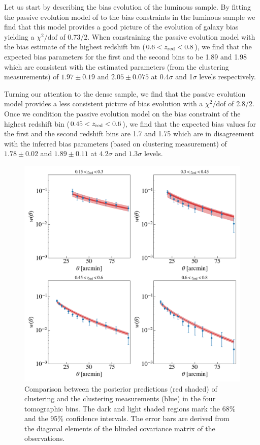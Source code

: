 \documentclass[fleqn,usenatbib,useAMS]{mnras}
\begin{document}
Let us start by describing the bias evolution of the luminous sample. By fitting the passive evolution model of \citet{Fry1996} to the bias constraints in the luminous sample we find that this model provides a good picture of the evolution of galaxy bias yielding a $\chi^2/\mathrm{dof}$ of 0.73/2. When constraining the passive evolution model with the bias estimate of the highest redshift bin ($0.6<z_{\rm red}<0.8$), we find that the expected bias parameters for the first and the second bins to be 1.89 and 1.98 which are consistent with the estimated parameters (from the clustering measurements) of $1.97\pm0.19$ and $2.05\pm 0.075$ at 0.4$\sigma$ and 1$\sigma$ levels respectively. 

Turning our attention to the dense sample, we find that the passive evolution model provides a less consistent picture of bias evolution with a $\chi^2/\mathrm{dof}$ of 2.8/2. Once we condition the passive evolution model on the bias constraint of the highest redshift bin ($0.45<z_{\rm red}<0.6$), we find that the expected bias values for the first and the second redshift bins are 1.7 and 1.75 which are in disagreement with the inferred bias parameters (based on clustering measurement) of $1.78\pm0.02$ and $1.89\pm 0.11$ at $4.2\sigma$ and $1.3\sigma$ levels. 

\begin{figure}
\includegraphics[width=\textwidth]{figures_tmp/sys/w_estimate.png}
\caption{\label{fig:w_estimate} Comparison between the posterior predictions (red shaded) of clustering and the clustering measurements (blue) in the four tomographic bins. The dark and light shaded regions mark the 68\% and the 95\% confidence intervals. The error bars are derived from the diagonal elements of the blinded covariance matrix of the observations.} 
\end{figure}
\end{document}
